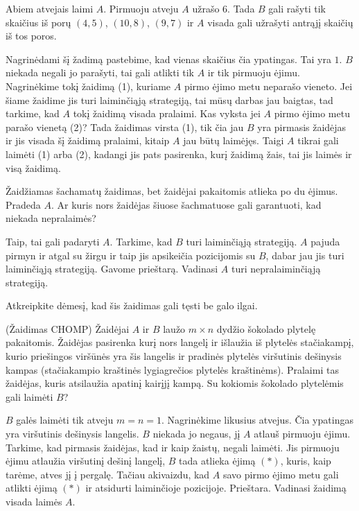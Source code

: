 Abiem atvejais laimi $A$. Pirmuoju atveju $A$ užrašo $6$. Tada $B$ gali rašyti tik
skaičius iš porų $(4,5)$, $(10,8)$, $(9,7)$ ir $A$ visada gali užrašyti antrąjį
skaičių iš tos poros.

Nagrinėdami šį žadimą pastebime, kad vienas skaičius čia ypatingas. Tai yra
$1$. $B$ niekada negali jo parašyti, tai gali atlikti tik $A$ ir tik
pirmuoju ėjimu. Nagrinėkime tokį žaidimą (1), kuriame $A$ pirmo ėjimo metu
neparašo vieneto. Jei šiame žaidime jis turi laiminčiąją strategiją, tai
mūsų darbas jau baigtas, tad tarkime, kad $A$ tokį žaidimą visada pralaimi.
Kas vyksta jei $A$ pirmo ėjimo metu parašo vienetą (2)? Tada žaidimas virsta
(1), tik čia jau $B$ yra pirmasis žaidėjas ir jis visada šį žaidimą
pralaimi, kitaip $A$ jau būtų laimėjęs. Taigi $A$ tikrai gali laimėti (1)
arba (2), kadangi jis pats pasirenka, kurį žaidimą žais, tai jis laimės ir
visą žaidimą. 

\begin{pavnr}
  Žaidžiamas šachamatų žaidimas, bet žaidėjai pakaitomis atlieka po du
  ėjimus. Pradeda $A$. Ar kuris nors žaidėjas šiuose šachmatuose gali
  garantuoti, kad niekada nepralaimės? 
\end{pavnr}

Taip, tai gali padaryti $A$. Tarkime, kad $B$ turi laiminčiąją strategiją.
$A$ pajuda pirmyn ir atgal su žirgu ir taip jis apsikeičia pozicijomis su
$B$, dabar jau jis turi laiminčiąją strategiją. Gavome prieštarą. Vadinasi
$A$ turi nepralaiminčiąją strategiją. 

\begin{pastaba}
  Atkreipkite dėmesį, kad šis žaidimas gali tęsti be galo ilgai.
\end{pastaba}

\begin{pavnr}{(Žaidimas CHOMP)}
  Žaidėjai $A$ ir $B$ laužo $m\times n$ dydžio šokolado plytelę pakaitomis.
  Žaidėjas pasirenka kurį nors langelį ir išlaužia iš plytelės stačiakampį,
  kurio  priešingos viršūnės yra šis langelis ir pradinės plytelės
  viršutinis dešinysis kampas (stačiakampio kraštinės lygiagrečios plytelės
  kraštinėms).  Pralaimi tas žaidėjas, kuris atsilaužia apatinį kairįjį
  kampą. Su kokiomis šokolado plytelėmis gali laimėti $B$?
\end{pavnr}

$B$ galės laimėti tik atveju $m=n=1$. Nagrinėkime likusius atvejus. Čia
ypatingas yra viršutinis dešinysis langelis. $B$ niekada jo negaus, jį $A$
atlauš pirmuoju ėjimu. Tarkime, kad pirmasis žaidėjas, kad ir kaip žaistų,
negali laimėti. Jis pirmuoju ėjimu atlaužia viršutinį dešinį langelį, $B$
tada atlieka ėjimą $(*)$, kuris, kaip tarėme, atves jį į pergalę. Tačiau
akivaizdu, kad $A$ savo pirmo ėjimo metu gali atlikti ėjimą $(*)$ ir
atsidurti laiminčioje pozicijoje. Prieštara. Vadinasi žaidimą visada laimės
$A$. 

